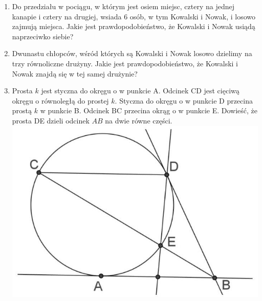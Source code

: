 \documentclass[10pt]{article}
\begin{document}
\begin{enumerate}
  \item Do przedziału w pociągu, w którym jest osiem miejsc, cztery na jednej kanapie i cztery na drugiej, wsiada 6 osób, w tym Kowalski i Nowak, i losowo zajmują miejsca. Jakie jest prawdopodobieństwo, że Kowalski i Nowak usiądą naprzeciwko siebie?
  \item Dwunastu chłopców, wśród których są Kowalski i Nowak losowo dzielimy na trzy równoliczne drużyny. Jakie jest prawdopodobieństwo, że Kowalski i Nowak znajdą się w tej samej drużynie?
  \item Prosta \(k\) jest styczna do okręgu o w punkcie A. Odcinek CD jest cięciwą okręgu o równoległą do prostej \(k\). Styczna do okręgu o w punkcie D przecina prostą \(k\) w punkcie B. Odcinek BC przecina okrąg o w punkcie E. Dowieść, że prosta DE dzieli odcinek \(A B\) na dwie równe części.\\
\includegraphics[max width=\textwidth, center]{2024_11_21_2623276ecdaf945c4cb3g-1}
\end{enumerate}
\end{document}

